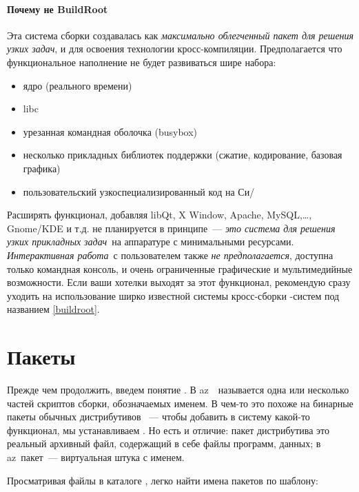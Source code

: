 \paragraph{Почему не BuildRoot}

Эта система сборки создавалась как \emph{максимально облегченный пакет
для решения узких задач}, и для освоения технологии кросс-компиляции.
Предполагается что функциональное наполнение не будет развиваться шире набора:

\begin{itemize}
  \item ядро (реального времени)
  \item libc
  \item урезанная командная оболочка (busybox)
  \item несколько прикладных библиотек поддержки (сжатие, кодирование, базовая
  графика)
  \item пользовательский узкоспециализированный код на Си/\cpp
\end{itemize}

Расширять функционал, добавляя libQt, X Window, Apache, MySQL,\ldots, Gnome/KDE
и т.д. не планируется в принципе\ --- \emph{это система для решения узких
прикладных задач}\ на аппаратуре с минимальными ресурсами. \emph{Интерактивная работа}\ с пользователем также
\emph{не предполагается}, доступна только командная консоль, и очень ограниченные графические и мультимедийные
возможности. Если ваши хотелки выходят за этот функционал, рекомендую сразу
уходить на использование ширко известной системы кросс-сборки \linux-систем под
названием \ref{buildroot}.

\section{Пакеты}

Прежде чем продолжить, введем понятие . В az\linux\ \
называется одна или несколько частей скриптов сборки, обозначаемых именем. В
чем-то это похоже на бинарные пакеты обычных дистрибутивов \linux\ --- чтобы
добавить в систему какой-то функционал, мы устанавливаем .
Но есть и отличие: пакет дистрибутива это реальный архивный файл, содержащий в
себе файлы программ, данных; в az\linux\ пакет\ --- виртуальная штука с именем.

Просматривая файлы в каталоге , легко найти имена пакетов по шаблону:

